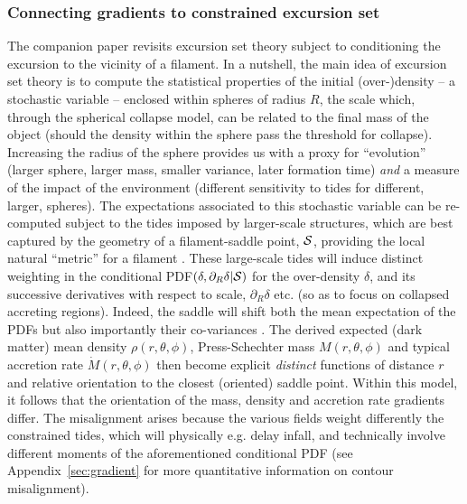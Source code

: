 \documentclass[useAMS,usenatbib]{mnras}
\begin{document}
\subsubsection{Connecting gradients to constrained excursion set}
The companion paper \citep{biaspaper}
revisits excursion set theory subject to  conditioning the excursion to  the vicinity of  a filament.
In a nutshell, the main idea of  excursion set theory is to compute the statistical properties of the initial (over-)density  -- a stochastic variable -- enclosed within spheres of radius $R$, the scale which, through the spherical collapse model, can be related to the final mass of the object (should the density within the sphere pass the threshold for collapse).
Increasing  the radius of the sphere provides us with a proxy for ``evolution'' (larger sphere, larger mass, smaller variance, later formation time) 
{\it and} a measure of the impact of the environment (different sensitivity to tides for different, larger, spheres). %
The  expectations  associated to this stochastic variable can be re-computed subject to the tides imposed by larger-scale structures, which are best captured by the geometry of a filament-saddle point, $\cal S$, providing the  local natural ``metric''  for a filament \citep{Codis2015}. 
These large-scale tides will induce distinct weighting in the conditional PDF$(\delta,\partial_R \delta|{\cal S})$ for the over-density $\delta$, and its successive derivatives with respect to scale, $\partial_R \delta$ etc.  (so as to focus on collapsed  accreting regions). Indeed, the saddle will shift both the mean expectation of the PDFs but also  importantly their co-variances \citep[see][for details]{biaspaper}.
The derived  expected (dark matter) mean density $ \rho(r,\theta,\phi)$, Press-Schechter mass $ M(r,\theta,\phi)$ and typical accretion rate $ \dot M(r,\theta,\phi) $ then become explicit {\sl distinct}  functions of distance  $r$ and relative orientation  to the closest (oriented) saddle point. 
Within this model, it follows that the orientation of the mass, density and accretion rate gradients differ.
The misalignment arises because the various fields weight differently the constrained tides,  which will physically e.g. delay infall, and technically involve different moments of the aforementioned conditional PDF (see Appendix~\ref{sec:gradient} for more quantitative information on contour misalignment).
\end{document}
